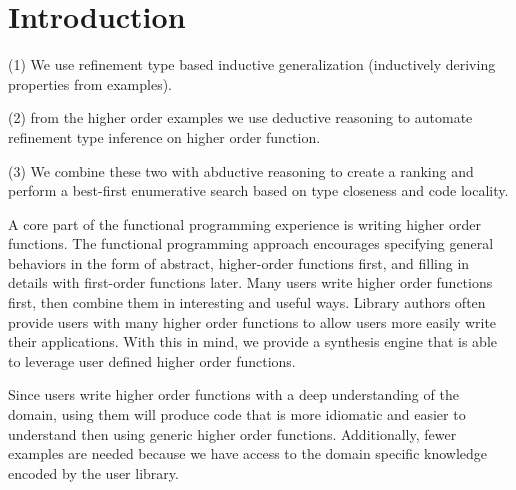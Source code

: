 \section{Introduction} 
\label{intro}

(1) We use refinement type based inductive generalization (inductively deriving properties from examples).

(2) from the higher order examples we use deductive reasoning to automate refinement type inference on higher order function.

(3) We combine these two with abductive reasoning to create a ranking and perform a best-first enumerative search based on type closeness and code locality. 

A core part of the functional programming experience is writing higher order functions. The functional programming approach encourages specifying general behaviors in the form of abstract, higher-order functions first, and filling in details with first-order functions later. Many users write higher order functions first, then combine them in interesting and useful ways. Library authors often provide users with many higher order functions to allow users more easily write their applications. With this in mind, we provide a synthesis engine that is able to leverage user defined higher order functions.

Since users write higher order functions with a deep understanding of the domain, using them will produce code that is more idiomatic and easier to understand then using generic higher order functions. Additionally, fewer examples are needed because we have access to the domain specific knowledge encoded by the user library.
